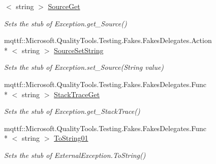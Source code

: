 \begin{DoxyCompactItemize}
$<$ string $>$ \hyperlink{class_system_1_1_runtime_1_1_interop_services_1_1_fakes_1_1_stub_s_e_h_exception_abed776d226c5283935a1bfc92bd8a939}{Source\-Get}
\begin{DoxyCompactList}\small\item\em Sets the stub of Exception.\-get\-\_\-\-Source()\end{DoxyCompactList}\item 
mqttf\-::\-Microsoft.\-Quality\-Tools.\-Testing.\-Fakes.\-Fakes\-Delegates.\-Action\\*
$<$ string $>$ \hyperlink{class_system_1_1_runtime_1_1_interop_services_1_1_fakes_1_1_stub_s_e_h_exception_a1256f302fdd49cb27cc5e7cf97f553d0}{Source\-Set\-String}
\begin{DoxyCompactList}\small\item\em Sets the stub of Exception.\-set\-\_\-\-Source(\-String value)\end{DoxyCompactList}\item 
mqttf\-::\-Microsoft.\-Quality\-Tools.\-Testing.\-Fakes.\-Fakes\-Delegates.\-Func\\*
$<$ string $>$ \hyperlink{class_system_1_1_runtime_1_1_interop_services_1_1_fakes_1_1_stub_s_e_h_exception_aa3448239fe0d3debf7db2a74cc384600}{Stack\-Trace\-Get}
\begin{DoxyCompactList}\small\item\em Sets the stub of Exception.\-get\-\_\-\-Stack\-Trace()\end{DoxyCompactList}\item 
mqttf\-::\-Microsoft.\-Quality\-Tools.\-Testing.\-Fakes.\-Fakes\-Delegates.\-Func\\*
$<$ string $>$ \hyperlink{class_system_1_1_runtime_1_1_interop_services_1_1_fakes_1_1_stub_s_e_h_exception_a4c54c6af2f8b7e3204ff86ceb3a9823f}{To\-String01}
\begin{DoxyCompactList}\small\item\em Sets the stub of External\-Exception.\-To\-String()\end{DoxyCompactList}\end{DoxyCompactItemize}
